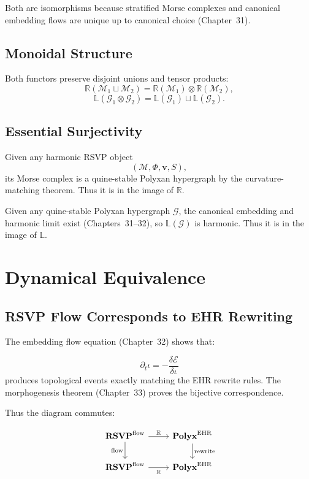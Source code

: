 Both are isomorphisms because stratified Morse complexes and canonical embedding
flows are unique up to canonical choice (Chapter~31).

\subsection{Monoidal Structure}

Both functors preserve disjoint unions and tensor products:
\[
\mathbb{R}(\mathcal{M}_1 \sqcup \mathcal{M}_2)
 = \mathbb{R}(\mathcal{M}_1) \otimes \mathbb{R}(\mathcal{M}_2),
\]
\[
\mathbb{L}(\mathcal{G}_1 \otimes \mathcal{G}_2)
 = \mathbb{L}(\mathcal{G}_1) \sqcup \mathbb{L}(\mathcal{G}_2).
\]

\subsection{Essential Surjectivity}

Given any harmonic RSVP object
\[
(\mathcal{M},\Phi,\mathbf{v},S),
\]
its Morse complex is a quine-stable Polyxan hypergraph by the curvature-matching
theorem.  
Thus it is in the image of $\mathbb{R}$.

Given any quine-stable Polyxan hypergraph $\mathcal{G}$, the canonical embedding
and harmonic limit exist (Chapters~31--32), so $\mathbb{L}(\mathcal{G})$ is
harmonic.  
Thus it is in the image of $\mathbb{L}$.



\section{Dynamical Equivalence}

\subsection{RSVP Flow Corresponds to EHR Rewriting}

The embedding flow equation (Chapter~32) shows that:

\[
\partial_t \iota
= -\frac{\delta \mathcal{E}}{\delta \iota}
\]
produces topological events exactly matching the EHR rewrite rules.  
The morphogenesis theorem (Chapter~33) proves the bijective correspondence.

Thus the diagram commutes:

\[
\begin{tikzcd}
\mathbf{RSVP}^{\mathrm{flow}} 
  \arrow[r,"\mathbb{R}"]
  \arrow[d,"\mathrm{flow}"']
&
\mathbf{Polyx}^{\mathrm{EHR}}
  \arrow[d,"\mathrm{rewrite}"]
\\
\mathbf{RSVP}^{\mathrm{flow}}
  \arrow[r,"\mathbb{R}"']
&
\mathbf{Polyx}^{\mathrm{EHR}}
\end{tikzcd}
\]


